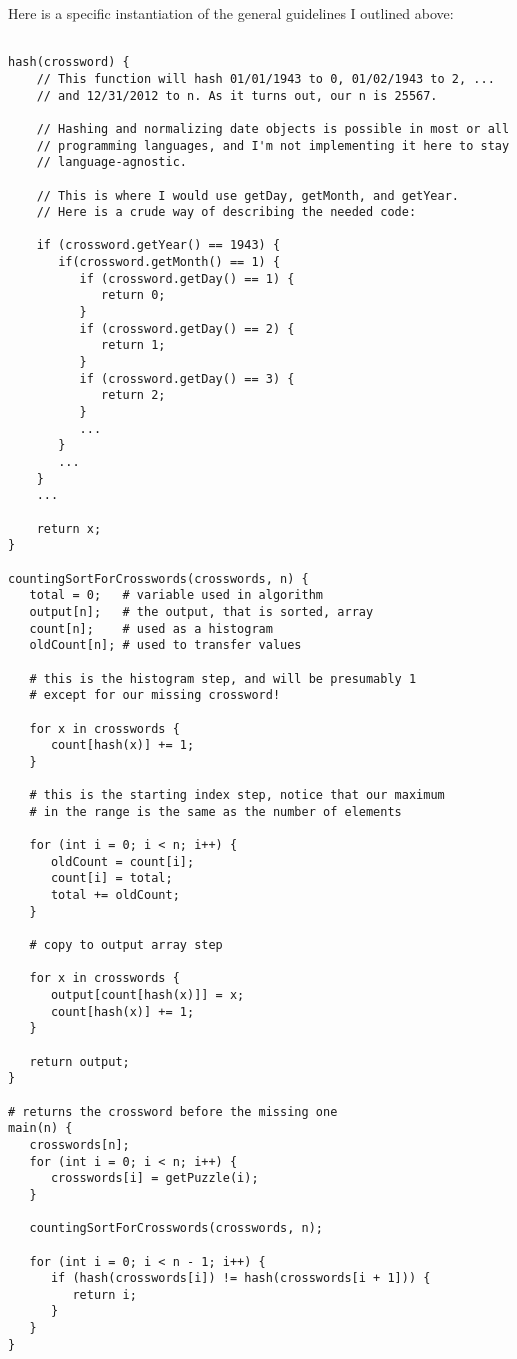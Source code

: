 \documentclass[11pt]{article}
\begin{document}
Here is a specific instantiation of the general guidelines I outlined above:

\begin{verbatim}

hash(crossword) {
    // This function will hash 01/01/1943 to 0, 01/02/1943 to 2, ... 
    // and 12/31/2012 to n. As it turns out, our n is 25567.
    
    // Hashing and normalizing date objects is possible in most or all 
    // programming languages, and I'm not implementing it here to stay
    // language-agnostic.
    
    // This is where I would use getDay, getMonth, and getYear.
    // Here is a crude way of describing the needed code:
    
    if (crossword.getYear() == 1943) {
       if(crossword.getMonth() == 1) {
          if (crossword.getDay() == 1) {
             return 0;
          }
          if (crossword.getDay() == 2) {
             return 1;
          }
          if (crossword.getDay() == 3) {
             return 2;
          }
          ...
       }
       ...
    }
    ...
    
    return x;
}

countingSortForCrosswords(crosswords, n) {
   total = 0;   # variable used in algorithm
   output[n];   # the output, that is sorted, array
   count[n];    # used as a histogram 
   oldCount[n]; # used to transfer values

   # this is the histogram step, and will be presumably 1
   # except for our missing crossword!
   
   for x in crosswords {
      count[hash(x)] += 1;
   }
   
   # this is the starting index step, notice that our maximum
   # in the range is the same as the number of elements
   
   for (int i = 0; i < n; i++) {
      oldCount = count[i];
      count[i] = total;
      total += oldCount;
   }
   
   # copy to output array step
   
   for x in crosswords {
      output[count[hash(x)]] = x;
      count[hash(x)] += 1;
   }
   
   return output;
}

# returns the crossword before the missing one
main(n) {
   crosswords[n];
   for (int i = 0; i < n; i++) {
      crosswords[i] = getPuzzle(i);
   }
   
   countingSortForCrosswords(crosswords, n);
   
   for (int i = 0; i < n - 1; i++) {
      if (hash(crosswords[i]) != hash(crosswords[i + 1])) {
         return i;
      }
   }
}

\end{verbatim}
\end{document}
